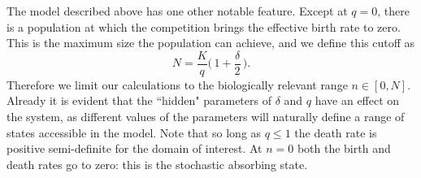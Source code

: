 The model described above has one other notable feature.
Except at $q=0$, there is a population at which the competition brings the effective birth rate to zero.
This is the maximum size the population can achieve, and we define this cutoff as
\begin{equation}
N = \frac{K}{q}\Big(\,1 + \frac{\delta}{2}\,\Big).
\label{maxN}
\end{equation}
Therefore we limit our calculations to the biologically relevant range $n\in[0,N]$. %
Already it is evident that the ``hidden" parameters of $\delta$ and $q$ have an effect on the system, as different values of the parameters will naturally define a range of states accessible in the model.
Note that so long as $q\leq 1$ the death rate is positive semi-definite for the domain of interest. %
At $n=0$ both the birth and death rates go to zero: this is the stochastic absorbing state.
